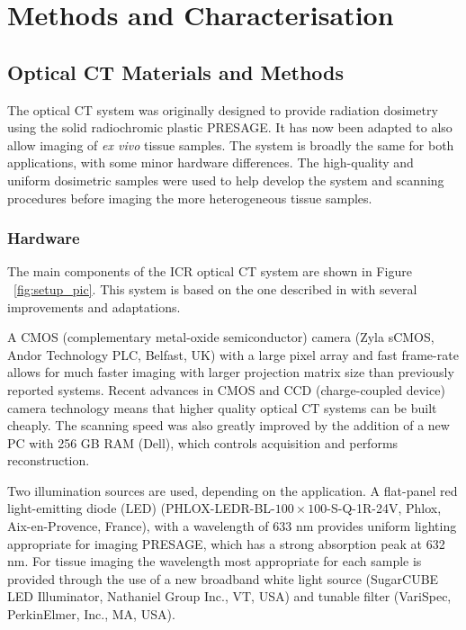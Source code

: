 \chapter{Methods and Characterisation}

\section{Optical CT Materials and Methods}
\label{sec:opticalCTmeth}

The optical CT system was originally designed to provide radiation dosimetry using the solid radiochromic plastic PRESAGE\textregistered. It has now been adapted to also allow imaging of \textit{ex vivo} tissue samples. The system is broadly the same for both applications, with some minor hardware differences. The high-quality and  uniform dosimetric samples were used to help develop the system and scanning procedures before imaging the more heterogeneous tissue samples.



\subsection{Hardware}
The main components of the ICR optical CT system are shown in Figure ~\ref{fig:setup_pic}. This system is based on the one described in \cite{doranestablishing2013} with several improvements and adaptations.

 A CMOS (complementary metal-oxide semiconductor) camera (Zyla sCMOS, Andor Technology PLC, Belfast, UK) with a large pixel array and fast frame-rate allows for much faster imaging with larger projection matrix size than previously reported systems. Recent advances in CMOS and CCD (charge-coupled device) camera technology means that higher quality optical CT systems can be built cheaply.  The scanning speed was also greatly improved by the addition of a new PC with 256 GB RAM (Dell), which controls acquisition and performs reconstruction.

Two illumination sources are used, depending on the application. A flat-panel red light-emitting diode (LED) 
(PHLOX-LEDR-BL-$100\times100$-S-Q-1R-24V, Phlox, Aix-en-Provence, France), with a wavelength of 633 nm provides uniform lighting appropriate for imaging PRESAGE\textregistered, which has a strong absorption peak at 632 nm. 
For tissue imaging the wavelength most appropriate for each sample is provided through the use of a  new broadband white light source (SugarCUBE LED Illuminator, Nathaniel Group Inc., VT, USA) and tunable filter (VariSpec, PerkinElmer, Inc., MA, USA). 


